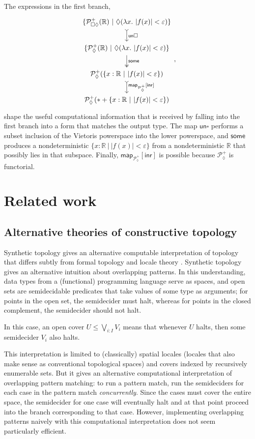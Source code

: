 \documentclass[conference]{IEEEtran}
\newcommand{\PLower}{\mathcal{P}_\lozenge}
\newcommand{\Viet}{\mathcal{P}_{\square\lozenge}}
\newcommand{\R}{\mathbb{R}}
\newcommand{\fun}[2]{\lambda {#1}.\  {#2}}
\newcommand{\suchthat}{\ |\ }
\newcommand{\One}{\ast}
\begin{document}
The expressions in the first branch,
\begin{equation*}
\begin{tikzcd}
\{ \Viet^+(\R) \suchthat \lozenge(\fun{x}{|f(x)| < \varepsilon}) \}
 \arrow[d, tail, "\mathsf{un}\square"]
\\ 
\{ \PLower^+(\R) \suchthat \lozenge(\fun{x}{|f(x)| < \varepsilon}) \}
 \arrow[d, two heads, "\mathsf{some}"]
\\ 
\PLower^+(\{x : \R \suchthat |f(x)| < \varepsilon \})
  \arrow[d, tail, "\mathsf{map}_{\PLower^+}{[\mathsf{inr}]}"]
\\
\PLower^+(\One + \{x : \R \suchthat |f(x)| < \varepsilon \})
\end{tikzcd},
\end{equation*}
shape the useful computational information that is received by falling into the first branch into a form that matches the output type. The map $\mathsf{un}\square$ performs a subset inclusion of the Vietoris powerspace into the lower powerspace, and $\mathsf{some}$ produces a nondeterministic $\{x : \R \suchthat |f(x)| < \varepsilon \}$ from a nondeterministic $\R$ that possibly lies in that subspace. Finally, $\mathsf{map}_{\PLower^+}[\mathsf{inr}]$ is possible because $\PLower^+$ is functorial.

\section{Related work}

\subsection{Alternative theories of constructive topology}

Synthetic topology gives an alternative computable interpretation of topology that differs subtly from formal topology and locale theory \cite{escardo2004, lesnik}. Synthetic topology gives an alternative intuition about overlapping patterns. In this understanding, data types from a (functional) programming language serve as spaces, and open sets are semidecidable predicates that take values of some type as arguments; for points in the open set, the semidecider must halt, whereas for points in the closed complement, the semidecider should not halt.

In this case, an open cover $U \le \bigvee_{i : I} V_i$ means that whenever $U$ halts, then some semidecider $V_i$ also halts.

This interpretation is limited to (classically) spatial locales (locales that also make sense as conventional topological spaces) and covers indexed by recursively enumerable sets. But it gives an alternative computational interpretation of overlapping pattern matching: to run a pattern match, run the semideciders for each case in the pattern match \emph{concurrently}. Since the cases must cover the entire space, the semidecider for one case will eventually halt and at that point proceed into the branch corresponding to that case. However, implementing overlapping patterns naively with this computational interpretation does not seem particularly efficient.
\end{document}
